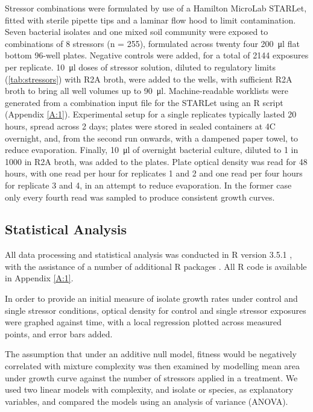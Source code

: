 \documentclass[10pt]{article}
\begin{document}
Stressor combinations were formulated by use of a Hamilton MicroLab STARLet, fitted with sterile  pipette tips and a laminar flow hood to limit contamination. Seven bacterial isolates and one mixed soil community were exposed to combinations of 8 stressors (n = 255), formulated across twenty four \SI{200}{\ul} flat bottom 96-well plates. Negative controls were added, for a total of 2144 exposures per replicate. \SI{10}{\ul} doses of stressor solution, diluted to regulatory limits (\cref{tab:stressors}) with R2A broth, were added to the wells, with sufficient R2A broth to bring all well volumes up to \SI{90}{\ul}. Machine-readable worklists were generated from a combination input file for the STARLet using an R script (Appendix \ref{A:1}). Experimental setup for a single replicates typically lasted 20 hours, spread across 2 days; plates were stored in sealed containers at 4\textdegree C overnight, and, from the second run onwards, with a dampened paper towel, to reduce evaporation. Finally, \SI{10}{\ul} of overnight bacterial culture, diluted to 1 in 1000 in R2A broth, was added to the plates. Plate optical density was read for 48 hours, with one read per hour for replicates 1 and 2 and one read per four hours for replicate 3 and 4, in an attempt to reduce evaporation. In the former case only every fourth read was sampled to produce consistent growth curves. 

\subsection{Statistical Analysis}
\label{S:2:6}
All data processing and statistical analysis was conducted in R version 3.5.1 \cite{RCoreTeam2018}, with the assistance of a number of additional R packages \cite{Auguie2017, Murrell2014,Garnier2018,Wickham2018b,Wickham2018c,Gagolewski2018,Bache2014,Muller2017,Kassambara2018,Wickham2016,Wickham2018a,Wickham2018}. All R code is available in Appendix \ref{A:1}.

In order to provide an initial measure of isolate growth rates under control and single stressor conditions, optical density for control and single stressor exposures were graphed against time, with a local regression plotted across measured points, and error bars added. 

The assumption that under an additive null model, fitness would be negatively correlated with mixture complexity was then examined by modelling mean area under growth curve against the number of stressors applied in a treatment. We used two linear models with complexity, and isolate or species, as explanatory variables, and compared the models using an analysis of variance (ANOVA). 
\end{document}
